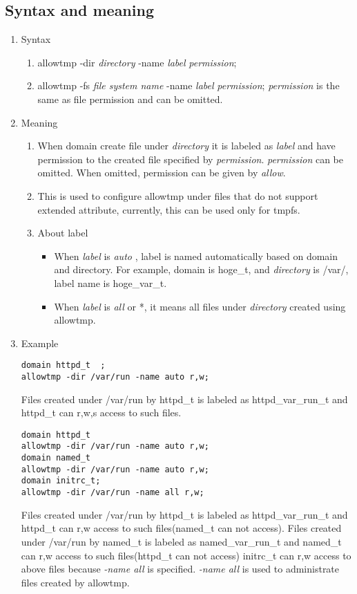 \documentclass{article}
\begin{document}
\subsection{Syntax and meaning}
\begin{enumerate}
 \item Syntax
       \begin{enumerate}
	\item allowtmp -dir {\it directory} -name {\it label} {\it
	      permission};
	\item  allowtmp -fs {\it file system name} -name {\it label} {\it
	      permission};
	      {\it permission} is the same as file permission and can be omitted.
       \end{enumerate}
 \item Meaning\\
       \begin{enumerate}
	\item When domain create file under {\it directory} it is
	      labeled as {\it label} and have permission to the created
	      file specified by {\it permission}. {\it permission} can
	      be omitted. When omitted, permission can be given by {\it allow}.
	\item This is used to configure allowtmp under files that do not
	      support extended attribute, currently, this can be used
	      only for tmpfs.
	\item About label
	      \begin{itemize}
	       \item When {\it label} is {\it auto }, label is named
		     automatically based on domain and directory. For example,
		     domain is hoge\_t, and {\it directory} is /var/, label
		     name is hoge\_var\_t.
	       \item When {\it label} is {\it all} or *, it means all
		     files under {\it directory} created using allowtmp.
	      \end{itemize}           
       \end{enumerate}       
 \item Example\\
       \begin{verbatim}
domain httpd_t	;
allowtmp -dir /var/run -name auto r,w;
       \end{verbatim}
Files created under /var/run by httpd\_t is labeled as
       httpd\_var\_run\_t and httpd\_t can r,w,s access to such files.

\begin{verbatim}
domain httpd_t
allowtmp -dir /var/run -name auto r,w;
domain named_t
allowtmp -dir /var/run -name auto r,w;
domain initrc_t;
allowtmp -dir /var/run -name all r,w;
\end{verbatim}
Files created under /var/run by httpd\_t is labeled as
       httpd\_var\_run\_t and httpd\_t can r,w access to such
       files(named\_t can not access).
Files created under /var/run by named\_t is labeled as
       named\_var\_run\_t and named\_t can r,w access to such
       files(httpd\_t can not access)
initrc\_t can r,w access to above files because {\it -name all} is
       specified. {\it -name all} is used to administrate files created
       by allowtmp.


\end{enumerate}
\end{document}
